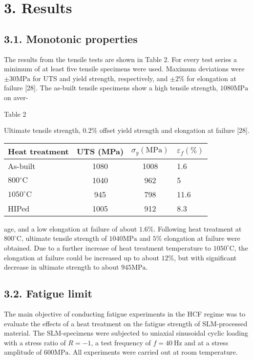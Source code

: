 \documentclass[10pt]{article}
\begin{document}
\section*{3. Results}
\subsection*{3.1. Monotonic properties}
The results from the tensile tests are shown in Table 2. For every test series a minimum of at least five tensile specimens were used. Maximum deviations were $\pm 30 \mathrm{MPa}$ for UTS and yield strength, respectively, and $\pm 2 \%$ for elongation at failure [28]. The as-built tensile specimens show a high tensile strength, $1080 \mathrm{MPa}$ on aver-

Table 2

Ultimate tensile strength, $0.2 \%$ offset yield strength and elongation at failure [28].

\begin{center}
\begin{tabular}{lccl}
\hline
Heat treatment & UTS (MPa) & $\sigma_{y}(\mathrm{MPa})$ & $\varepsilon_{f}(\%)$ \\
\hline
As-built & 1080 & 1008 & 1.6 \\
$800{ }^{\circ} \mathrm{C}$ & 1040 & 962 & 5 \\
$1050^{\circ} \mathrm{C}$ & 945 & 798 & 11.6 \\
HIPed & 1005 & 912 & 8.3 \\
\hline
\end{tabular}
\end{center}

age, and a low elongation at failure of about $1.6 \%$. Following heat treatment at $800^{\circ} \mathrm{C}$, ultimate tensile strength of $1040 \mathrm{MPa}$ and $5 \%$ elongation at failure were obtained. Due to a further increase of heat treatment temperature to $1050^{\circ} \mathrm{C}$, the elongation at failure could be increased up to about $12 \%$, but with significant decrease in ultimate strength to about $945 \mathrm{MPa}$.

\subsection*{3.2. Fatigue limit}
The main objective of conducting fatigue experiments in the HCF regime was to evaluate the effects of a heat treatment on the fatigue strength of SLM-processed material. The SLM-specimens were subjected to uniaxial sinusoidal cyclic loading with a stress ratio of $R=-1$, a test frequency of $f=40 \mathrm{~Hz}$ and at a stress amplitude of $600 \mathrm{MPa}$. All experiments were carried out at room temperature.
\end{document}
